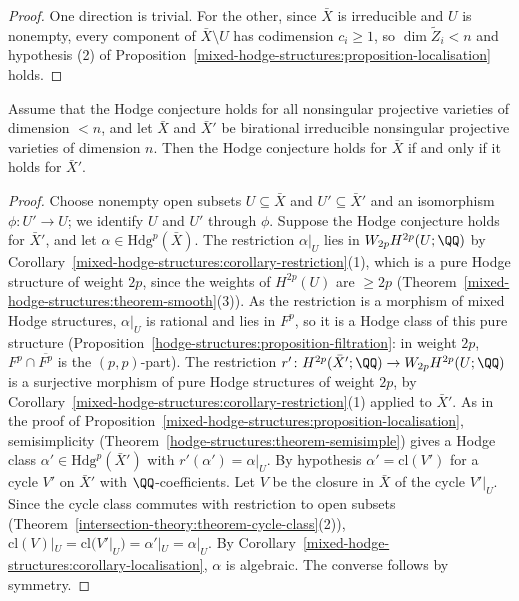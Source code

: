 \begin{proof}
One direction is trivial. For the other, since $\bar X$ is irreducible and $U$ is nonempty, every component of $\bar X \setminus U$ has codimension $c_i \geq 1$, so $\dim\tilde Z_i < n$ and hypothesis (2) of
Proposition~\ref{mixed-hodge-structures:proposition-localisation} holds.
\end{proof}

\begin{corollary}\label{mixed-hodge-structures:corollary-birational}
Assume that the Hodge conjecture holds for all nonsingular projective varieties of dimension $< n$, and let $\bar X$ and $\bar X'$ be birational irreducible nonsingular projective varieties of dimension $n$.
Then the Hodge conjecture holds for $\bar X$ if and only if it holds for $\bar X'$.
\end{corollary}

\begin{proof}
Choose nonempty open subsets $U \subseteq \bar X$ and $U' \subseteq \bar X'$ and an isomorphism $\phi \colon U' \to U$; we identify $U$ and $U'$ through $\phi$. Suppose the Hodge conjecture holds for
$\bar X'$, and let $\alpha \in \mathrm{Hdg}^p(\bar X)$. The restriction $\alpha|_U$ lies in $W_{2p}H^{2p}(U; \QQ)$ by Corollary~\ref{mixed-hodge-structures:corollary-restriction}(1), which is a pure Hodge
structure of weight $2p$, since the weights of $H^{2p}(U)$ are $\geq 2p$ (Theorem~\ref{mixed-hodge-structures:theorem-smooth}(3)). As the restriction is a morphism of mixed Hodge structures, $\alpha|_U$ is
rational and lies in $F^p$, so it is a Hodge class of this pure structure (Proposition~\ref{hodge-structures:proposition-filtration}: in weight $2p$, $F^p \cap \overline{F^p}$ is the $(p,p)$-part). The restriction
$r' \colon H^{2p}(\bar X'; \QQ) \to W_{2p}H^{2p}(U; \QQ)$ is a surjective morphism of pure Hodge structures of weight $2p$, by Corollary~\ref{mixed-hodge-structures:corollary-restriction}(1) applied to $\bar X'$.
As in the proof of Proposition~\ref{mixed-hodge-structures:proposition-localisation}, semisimplicity (Theorem~\ref{hodge-structures:theorem-semisimple}) gives a Hodge class $\alpha' \in \mathrm{Hdg}^p(\bar X')$ with
$r'(\alpha') = \alpha|_U$. By hypothesis $\alpha' = \mathrm{cl}(V')$ for a cycle $V'$ on $\bar X'$ with $\QQ$-coefficients. Let $V$ be the closure in $\bar X$ of the cycle $V'|_U$. Since the cycle class
commutes with restriction to open subsets (Theorem~\ref{intersection-theory:theorem-cycle-class}(2)), $\mathrm{cl}(V)|_U = \mathrm{cl}(V'|_U) = \alpha'|_U = \alpha|_U$. By
Corollary~\ref{mixed-hodge-structures:corollary-localisation}, $\alpha$ is algebraic. The converse follows by symmetry.
\end{proof}

